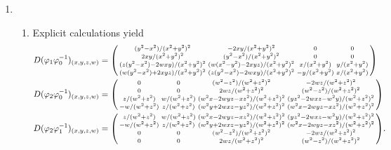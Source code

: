 \documentclass[11pt,leqno]{article}
\theoremstyle{plain}
\theoremstyle{definition}
\numberwithin{equation}{section}
\numberwithin{lem}{section}
\begin{document}
\begin{enumerate}
    \item \begin{enumerate}
      \item Explicit calculations yield \begin{align*}
        D(\varphi_1\varphi_0^{-1})_{(x,y,z,w)} &= \begin{psmallmatrix}
          (y^2 - x^2)/(x^2 + y^2)^2 & -2 x y/(x^2 + y^2)^2 & 0 & 0\\
          2 x y/(x^2 + y^2)^2 & (y^2 - x^2)/(x^2 + y^2)^2 & 0 & 0\\
          (z (y^2 - x^2) - 2 w x y)/(x^2 + y^2)^2 & (w (x^2 - y^2) - 2 x y z)/(x^2 + y^2)^2 & x/(x^2 + y^2) & y/(x^2 + y^2)\\
          (w (y^2 - x^2) + 2 x y z)/(x^2 + y^2)^2 & (z (y^2 - x^2) - 2 w x y)/(x^2 + y^2)^2 & -y/(x^2 + y^2) & x/(x^2 + y^2)
        \end{psmallmatrix}\\
        D(\varphi_2\varphi_0^{-1})_{(x,y,z,w)} &= \begin{psmallmatrix}
          0 & 0 & (w^2 - z^2)/(w^2 + z^2)^2 & -2 w z/(w^2 + z^2)^2\\
          0 & 0 & 2 w z/(w^2 + z^2)^2 & (w^2 - z^2)/(w^2 + z^2)^2\\
          z/(w^2 + z^2) & w/(w^2 + z^2) & (w^2 x - 2 w y z - x z^2)/(w^2 + z^2)^2 & (y z^2 - 2 w x z - w^2 y)/(w^2 + z^2)^2\\
          -w/(w^2 + z^2) & z/(w^2 + z^2) & (w^2 y + 2 w x z - y z^2)/(w^2 + z^2)^2 & (w^2 x - 2 w y z - x z^2)/(w^2 + z^2)^2
        \end{psmallmatrix}\\
        D(\varphi_2\varphi_1^{-1})_{(x,y,z,w)} &= \begin{psmallmatrix}
          z/(w^2 + z^2) & w/(w^2 + z^2) & (w^2 x - 2 w y z - x z^2)/(w^2 + z^2)^2 & (y z^2 - 2 w x z - w^2 y)/(w^2 + z^2)^2\\
          -w/(w^2 + z^2) & z/(w^2 + z^2) & (w^2 y + 2 w x z - y z^2)/(w^2 + z^2)^2 & (w^2 x - 2 w y z - x z^2)/(w^2 + z^2)^2\\
          0 & 0 & (w^2 - z^2)/(w^2 + z^2)^2 & -2 w z/(w^2 + z^2)^2\\
          0 & 0 & 2 w z/(w^2 + z^2)^2 & (w^2 - z^2)/(w^2 + z^2)^2
        \end{psmallmatrix}.
      \end{align*}


\end{enumerate}
\end{enumerate}
\end{document}
